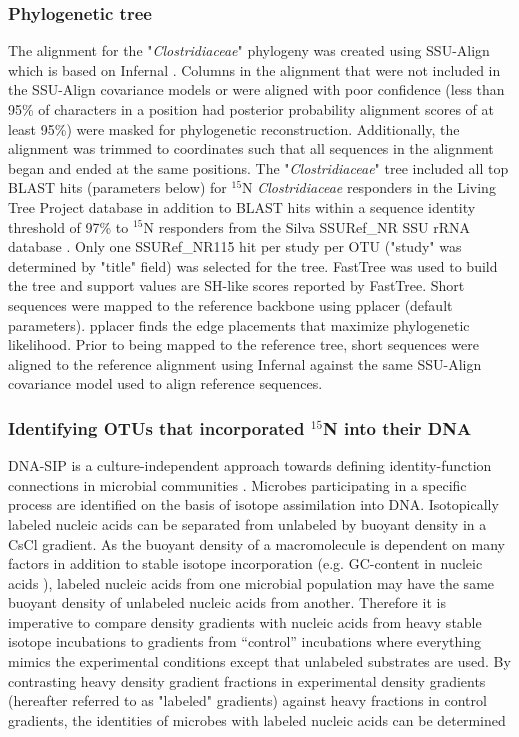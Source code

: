 \subsubsection{Phylogenetic tree}
The alignment for the "\textit{Clostridiaceae}" phylogeny was created using
SSU-Align which is based on Infernal \citep{24008419, 19307242}. Columns in the
alignment that were not included in the SSU-Align covariance models or were
aligned with poor confidence (less than 95\% of characters in a position had
posterior probability alignment scores of at least 95\%) were masked for
phylogenetic reconstruction. Additionally, the alignment was trimmed to
coordinates such that all sequences in the alignment began and ended at the
same positions. The "\textit{Clostridiaceae}" tree included all top BLAST hits
(parameters below) for $^{15}$N \textit{Clostridiaceae} responders in the
Living Tree Project database \citep{Yarza_2008} in addition to BLAST hits
within a sequence identity
threshold of 97\% to $^{15}$N responders from the Silva SSURef\_NR SSU rRNA
database \citep{17947321}. Only one SSURef\_NR115 hit per study per OTU
("study" was determined by "title" field) was selected for the tree. FastTree
\citep{20224823} was used to build the tree and support values are
SH-like scores reported by FastTree. Short sequences were mapped to the
reference backbone using pplacer \citep{Matsen_2010} (default parameters).
pplacer finds the edge placements that maximize phylogenetic likelihood. Prior
to being mapped to the reference tree, short sequences were aligned to the
reference alignment using Infernal \citep{19307242} against the same SSU-Align
covariance model used to align reference sequences.

\subsubsection{Identifying OTUs that incorporated $^{15}$N into their DNA}
DNA-SIP is a culture-independent approach towards defining identity-function
connections in microbial communities \citep{Buckley_2011, 17446886, Radajewski_2001}. Microbes
participating in a specific process are identified on the basis of isotope
assimilation into DNA. Isotopically labeled nucleic acids can be
separated from unlabeled by buoyant density in a CsCl gradient. As the
buoyant density of a macromolecule is dependent on many factors in addition
to stable isotope incorporation (e.g. GC-content in nucleic acids
\citep{25139123}), labeled nucleic acids from one microbial population may
have the same buoyant density of unlabeled nucleic acids from another.
Therefore it is imperative to compare density gradients with nucleic acids
from heavy stable isotope incubations to gradients from ``control''
incubations where everything mimics the experimental conditions except that
unlabeled substrates are used. By contrasting heavy density gradient
fractions in experimental density gradients (hereafter referred to as "labeled"
gradients) against heavy fractions in control gradients, the identities of
microbes with labeled nucleic acids can be determined 


